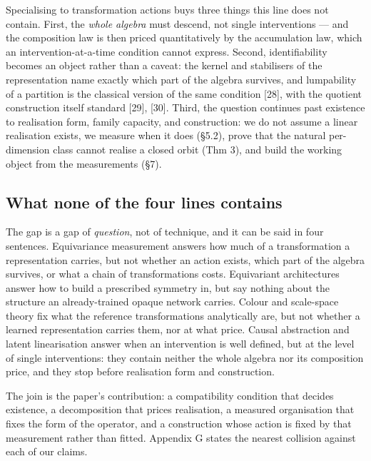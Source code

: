 Specialising to transformation actions buys three things this line does not contain. First, the \textit{whole algebra} must descend, not single interventions --- and the composition law is then priced quantitatively by the accumulation law, which an intervention-at-a-time condition cannot express. Second, identifiability becomes an object rather than a caveat: the kernel and stabilisers of the representation name exactly which part of the algebra survives, and lumpability of a partition is the classical version of the same condition [28], with the quotient construction itself standard [29], [30]. Third, the question continues past existence to realisation form, family capacity, and construction: we do not assume a linear realisation exists, we measure when it does (\S{}5.2), prove that the natural per-dimension class cannot realise a closed orbit (Thm 3), and build the working object from the measurements (\S{}7).

\subsection{What none of the four lines contains}

The gap is a gap of \textit{question}, not of technique, and it can be said in four sentences. Equivariance measurement answers how much of a transformation a representation carries, but not whether an action exists, which part of the algebra survives, or what a chain of transformations costs. Equivariant architectures answer how to build a prescribed symmetry in, but say nothing about the structure an already-trained opaque network carries. Colour and scale-space theory fix what the reference transformations analytically are, but not whether a learned representation carries them, nor at what price. Causal abstraction and latent linearisation answer when an intervention is well defined, but at the level of single interventions: they contain neither the whole algebra nor its composition price, and they stop before realisation form and construction.

The join is the paper's contribution: a compatibility condition that decides existence, a decomposition that prices realisation, a measured organisation that fixes the form of the operator, and a construction whose action is fixed by that measurement rather than fitted. Appendix G states the nearest collision against each of our claims.
